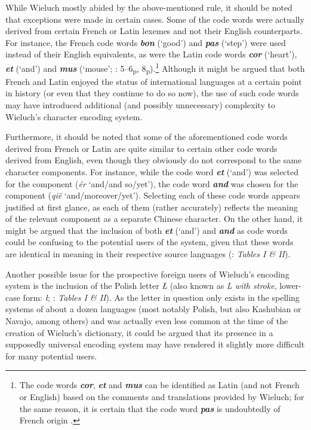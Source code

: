 \documentclass[output=paper,colorlinks,citecolor=brown,arabicfont,chinesefont]{langscibook}
\begin{document}
While Wieluch mostly abided by the above-mentioned rule, it should be noted that exceptions were made in certain cases. Some of the code words were actually derived from certain French or Latin lexemes and not their English counterparts. For instance, the French code words \textbf{\emph{bon}} (‘good’) and \textbf{\emph{pas}} (‘step’) were used instead of their English equivalents, as were the Latin code words \textbf{\emph{cor}} (‘heart’), \textbf{\emph{et}} (‘and’) and \textbf{\emph{mus}} (‘mouse’; \citealt{Wieluch1936}: 5–6\textsubscript{p}, 8\textsubscript{p}).\footnote{The code words \textbf{\emph{cor}}, \textbf{\emph{et}} and \textbf{\emph{mus}} can be identified as Latin (and not French or English) based on the comments and translations provided by Wieluch; for the same reason, it is certain that the code word \textbf{\emph{pas}} is undoubtedly of French origin \citep[5-6\textsubscript{p}, 8\textsubscript{p}]{Wieluch1936}.
}  Although it might be argued that both French and Latin enjoyed the status of international languages at a certain point in history (or even that they continue to do so now), the use of such code words may have introduced additional (and possibly unnecessary) complexity to Wieluch's character encoding system.

Furthermore, it should be noted that some of the aforementioned code words derived from French or Latin are quite similar to certain other code words derived from English, even though they obviously do not correspond to the same character components. For instance, while the code word \textbf{\emph{et}} (‘and’) was selected for the component {} (\emph{ér} ‘and/and so/yet’), the code word \textbf{\emph{and}} was chosen for the component {} (\emph{qiě} ‘and/moreover/yet’). Selecting each of these code words appears justified at first glance, as each of them (rather accurately) reflects the meaning of the relevant component as a separate Chinese character. On the other hand, it might be argued that the inclusion of both \textbf{\emph{et}} (‘and’) and \textbf{\emph{and}} as code words could be confusing to the potential users of the system, given that these words are identical in meaning in their respective source languages (\citealt{Wieluch1936}: \emph{Tables I \& II}).

Another possible issue for the prospective foreign users of Wieluch's encoding system is the inclusion of the Polish letter \emph{Ł} (also known as \emph{L with stroke}, lower-case form: \emph{ł}; \citealt{Wieluch1936}: \emph{Tables I \& II}). As the letter in question only exists in the spelling systems of about a dozen languages (most notably Polish, but also Kashubian or Navajo, among others) and was actually even less common at the time of the creation of Wieluch's dictionary, it could be argued that its presence
in a supposedly universal encoding system may have rendered 
it slightly more difficult for many potential users.
\end{document}
